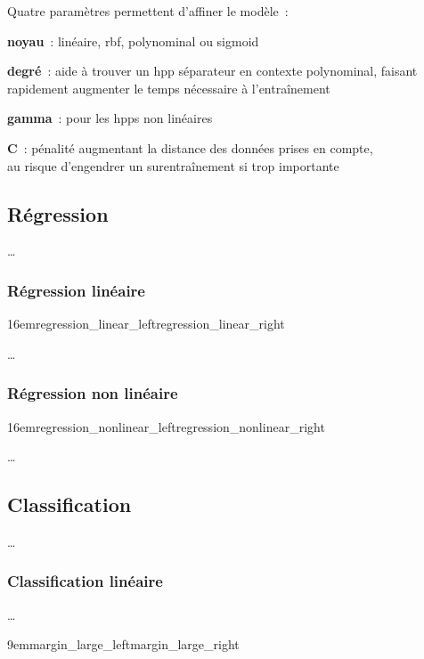 Quatre paramètres permettent d’affiner le modèle :
\begin{itmz}
\item{\textbf{noyau} : linéaire, \gls{rbf}, polynominal ou \gls{sigmoid}}
\item{\textbf{degré} : aide à trouver un \gls{hpp} séparateur en contexte polynominal,
faisant rapidement augmenter le temps nécessaire à l’entraînement}
\item{\textbf{gamma} : pour les \glspl{hpp} non linéaires}
\item{\textbf{C} : pénalité augmentant la distance des données prises en compte,\\
au risque d’engendrer un surentraînement si trop importante}
\end{itmz}

\pagebreak

\subsection{Régression}

…

\subsubsection{Régression linéaire}

{16em}{regression_linear_left}{regression_linear_right}

…

\subsubsection{Régression non linéaire}

{16em}{regression_nonlinear_left}{regression_nonlinear_right}

…

\subsection{Classification}

…

\subsubsection{Classification linéaire}

…

{9em}{margin_large_left}{margin_large_right}

